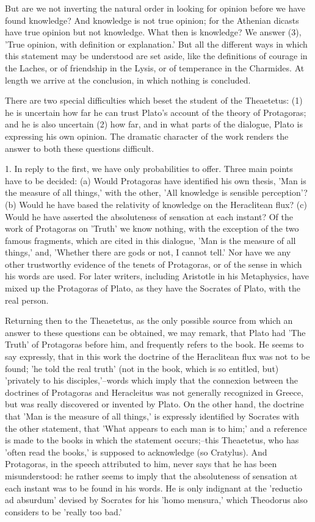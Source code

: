 But are we not inverting the natural order in looking for opinion before
we have found knowledge? And knowledge is not true opinion; for the
Athenian dicasts have true opinion but not knowledge. What then
is knowledge? We answer (3), 'True opinion, with definition or
explanation.' But all the different ways in which this statement may be
understood are set aside, like the definitions of courage in the Laches,
or of friendship in the Lysis, or of temperance in the Charmides. At
length we arrive at the conclusion, in which nothing is concluded.

There are two special difficulties which beset the student of the
Theaetetus: (1) he is uncertain how far he can trust Plato's account of
the theory of Protagoras; and he is also uncertain (2) how far, and in
what parts of the dialogue, Plato is expressing his own opinion.
The dramatic character of the work renders the answer to both these
questions difficult.

1. In reply to the first, we have only probabilities to offer. Three
main points have to be decided: (a) Would Protagoras have identified
his own thesis, 'Man is the measure of all things,' with the other,
'All knowledge is sensible perception'? (b) Would he have based the
relativity of knowledge on the Heraclitean flux? (c) Would he have
asserted the absoluteness of sensation at each instant? Of the work of
Protagoras on 'Truth' we know nothing, with the exception of the two
famous fragments, which are cited in this dialogue, 'Man is the measure
of all things,' and, 'Whether there are gods or not, I cannot tell.' Nor
have we any other trustworthy evidence of the tenets of Protagoras, or
of the sense in which his words are used. For later writers, including
Aristotle in his Metaphysics, have mixed up the Protagoras of Plato, as
they have the Socrates of Plato, with the real person.

Returning then to the Theaetetus, as the only possible source from which
an answer to these questions can be obtained, we may remark, that Plato
had 'The Truth' of Protagoras before him, and frequently refers to the
book. He seems to say expressly, that in this work the doctrine of the
Heraclitean flux was not to be found; 'he told the real truth' (not
in the book, which is so entitled, but) 'privately to his
disciples,'--words which imply that the connexion between the doctrines
of Protagoras and Heracleitus was not generally recognized in Greece,
but was really discovered or invented by Plato. On the other hand,
the doctrine that 'Man is the measure of all things,' is expressly
identified by Socrates with the other statement, that 'What appears to
each man is to him;' and a reference is made to the books in which the
statement occurs;--this Theaetetus, who has 'often read the books,' is
supposed to acknowledge (so Cratylus). And Protagoras, in the speech
attributed to him, never says that he has been misunderstood: he rather
seems to imply that the absoluteness of sensation at each instant was
to be found in his words. He is only indignant at the 'reductio ad
absurdum' devised by Socrates for his 'homo mensura,' which Theodorus
also considers to be 'really too bad.'

